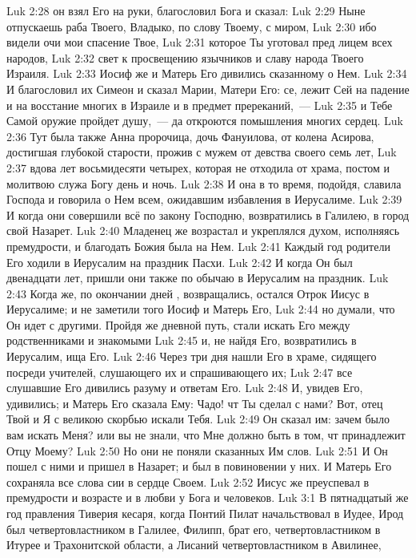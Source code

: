 \vs Luk 2:28 он взял Его на руки, благословил Бога и сказал:
\rsbpar\vs Luk 2:29 Ныне отпускаешь раба Твоего, Владыко, по слову Твоему, с миром,
\vs Luk 2:30 ибо видели очи мои спасение Твое,
\vs Luk 2:31 которое Ты уготовал пред лицем всех народов,
\vs Luk 2:32 свет к просвещению язычников и славу народа Твоего Израиля.
\rsbpar\vs Luk 2:33 Иосиф же и Матерь Его дивились сказанному о Нем.
\vs Luk 2:34 И благословил их Симеон и сказал Марии, Матери Его: се, лежит Сей на падение и на восстание многих в Израиле и в предмет пререканий,~---
\vs Luk 2:35 и Тебе Самой оружие пройдет душу,~--- да откроются помышления многих сердец.
\vs Luk 2:36 Тут была также Анна пророчица, дочь Фануилова, от колена Асирова, достигшая глубокой старости, прожив с мужем от девства своего семь лет,
\vs Luk 2:37 вдова лет восьмидесяти четырех, которая не отходила от храма, постом и молитвою служа Богу день и ночь.
\vs Luk 2:38 И она в то время, подойдя, славила Господа и говорила о Нем всем, ожидавшим избавления в Иерусалиме.
\rsbpar\vs Luk 2:39 И когда они совершили всё по закону Господню, возвратились в Галилею, в город свой Назарет.
\vs Luk 2:40 Младенец же возрастал и укреплялся духом, исполняясь премудрости, и благодать Божия была на Нем.
\vs Luk 2:41 Каждый год родители Его ходили в Иерусалим на праздник Пасхи.
\vs Luk 2:42 И когда Он был двенадцати лет, пришли они также по обычаю в Иерусалим на праздник.
\vs Luk 2:43 Когда же, по окончании дней , возвращались, остался Отрок Иисус в Иерусалиме; и не заметили того Иосиф и Матерь Его,
\vs Luk 2:44 но думали, что Он идет с другими. Пройдя же дневной путь, стали искать Его между родственниками и знакомыми
\vs Luk 2:45 и, не найдя Его, возвратились в Иерусалим, ища Его.
\vs Luk 2:46 Через три дня нашли Его в храме, сидящего посреди учителей, слушающего их и спрашивающего их;
\vs Luk 2:47 все слушавшие Его дивились разуму и ответам Его.
\vs Luk 2:48 И, увидев Его, удивились; и Матерь Его сказала Ему: Чадо! чт Ты сделал с нами? Вот, отец Твой и Я с великою скорбью искали Тебя.
\vs Luk 2:49 Он сказал им: зачем было вам искать Меня? или вы не знали, что Мне должно быть в том, чт принадлежит Отцу Моему?
\vs Luk 2:50 Но они не поняли сказанных Им слов.
\vs Luk 2:51 И Он пошел с ними и пришел в Назарет; и был в повиновении у них. И Матерь Его сохраняла все слова сии в сердце Своем.
\vs Luk 2:52 Иисус же преуспевал в премудрости и возрасте и в любви у Бога и человеков.
\vs Luk 3:1 В пятнадцатый же год правления Тиверия кесаря, когда Понтий Пилат начальствовал в Иудее, Ирод был четвертовластником в Галилее, Филипп, брат его, четвертовластником в Итурее и Трахонитской области, а Лисаний четвертовластником в Авилинее,
